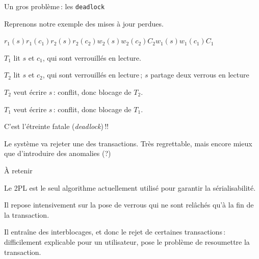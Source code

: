 \begin{frame}{Un gros problème\,: les \texttt{deadlock}}


Reprenons notre exemple des mises à jour perdues.

\begin{center}
$r_1(s)  r_1(c_1) r_2(s)  r_2(c_2) 
 w_2(s)  w_2(c_2) C_2 w_1(s) w_1(c_1) C_1$
\end{center}

\begin{redbullet}
  \item $T_1$ lit $s$ et $c_1$, qui sont verrouillés en lecture.
  \item $T_2$ lit $s$ et $c_2$, qui sont verrouillés en lecture\,;
     \alert{$s$ partage deux verrous en lecture}

  \item $T_2$ veut écrire $s$\,: conflit, donc blocage de $T_2$.

  \item $T_1$ veut écrire $s$\,: conflit, donc blocage de $T_1$.
\end{redbullet}

C'est \alert{l'étreinte fatale} (\textit{deadlock})\,!!

\vfill

\begin{blocgauche}
 Le système va rejeter une
des transactions.
Très regrettable, mais encore mieux que d'introduire des anomalies (?)
\end{blocgauche}
\end{frame}


\begin{frame}{À retenir}

Le 2PL est le seul algorithme actuellement utilisé pour garantir la sérialisabilité.

\vfill

Il repose intensivement sur la pose de verrous qui ne sont relâchés qu'à la fin de la transaction.

\vfill
\begin{blocgauche}
Il entraîne des interblocages, et donc le rejet de certaines transactions\,: difficilement explicable pour
un utilisateur, pose le problème de resoumettre la transaction.
\end{blocgauche}

\end{frame}

